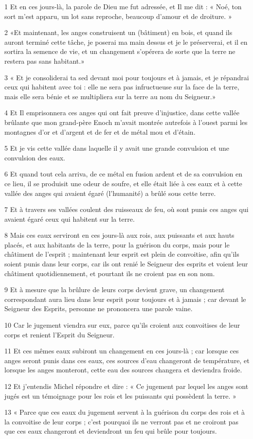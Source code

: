 \par 1 Et en ces jours-là, la parole de Dieu me fut adressée, et Il me dit : « Noé, ton sort m'est apparu, un lot sans reproche, beaucoup d'amour et de droiture. »
\par 2 «Et maintenant, les anges construisent un (bâtiment) en bois, et quand ils auront terminé cette tâche, je poserai ma main dessus et je le préserverai, et il en sortira la semence de vie, et un changement s'opérera de sorte que la terre ne restera pas sans habitant.»
\par 3 « Et je consoliderai ta sed devant moi pour toujours et à jamais, et je répandrai ceux qui habitent avec toi : elle ne sera pas infructueuse sur la face de la terre, mais elle sera bénie et se multipliera sur la terre au nom du Seigneur.»
\par 4 Et Il emprisonnera ces anges qui ont fait preuve d'injustice, dans cette vallée brûlante que mon grand-père Enoch m'avait montrée autrefois à l'ouest parmi les montagnes d'or et d'argent et de fer et de métal mou et d'étain.
\par 5 Et je vis cette vallée dans laquelle il y avait une grande convulsion et une convulsion des eaux.
\par 6 Et quand tout cela arriva, de ce métal en fusion ardent et de sa convulsion en ce lieu, il se produisit une odeur de soufre, et elle était liée à ces eaux et à cette vallée des anges qui avaient égaré (l’humanité) a brûlé sous cette terre.
\par 7 Et à travers ses vallées coulent des ruisseaux de feu, où sont punis ces anges qui avaient égaré ceux qui habitent sur la terre.
\par 8 Mais ces eaux serviront en ces jours-là aux rois, aux puissants et aux hauts placés, et aux habitants de la terre, pour la guérison du corps, mais pour le châtiment de l'esprit ; maintenant leur esprit est plein de convoitise, afin qu'ils soient punis dans leur corps, car ils ont renié le Seigneur des esprits et voient leur châtiment quotidiennement, et pourtant ils ne croient pas en son nom.
\par 9 Et à mesure que la brûlure de leurs corps devient grave, un changement correspondant aura lieu dans leur esprit pour toujours et à jamais ; car devant le Seigneur des Esprits, personne ne prononcera une parole vaine.
\par 10 Car le jugement viendra sur eux, parce qu'ils croient aux convoitises de leur corps et renient l'Esprit du Seigneur.
\par 11 Et ces mêmes eaux subiront un changement en ces jours-là ; car lorsque ces anges seront punis dans ces eaux, ces sources d'eau changeront de température, et lorsque les anges monteront, cette eau des sources changera et deviendra froide.
\par 12 Et j'entendis Michel répondre et dire : « Ce jugement par lequel les anges sont jugés est un témoignage pour les rois et les puissants qui possèdent la terre. »
\par 13 « Parce que ces eaux du jugement servent à la guérison du corps des rois et à la convoitise de leur corps ; c’est pourquoi ils ne verront pas et ne croiront pas que ces eaux changeront et deviendront un feu qui brûle pour toujours.


